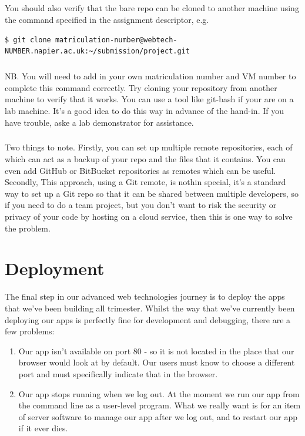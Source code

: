 \documentclass[12pt, a4paper, oneside]{book}
\begin{document}
{\paragraph{} You should also verify that the bare repo can be cloned to another machine using the command specified in the assignment descriptor, e.g.

\begin{lstlisting}[style=DOS]
    $ git clone matriculation-number@webtech-NUMBER.napier.ac.uk:~/submission/project.git
\end{lstlisting}

\paragraph{} NB. You will need to add in your own matriculation number and VM number to complete this command correctly. Try cloning your repository from another machine to verify that it works. You can use a tool like git-bash if your are on a lab machine. It's a good idea to do this way in advance of the hand-in. If you have trouble, aske a lab demonstrator for assistance.

\paragraph{} Two things to note. Firstly, you can set up multiple remote repositories, each of which can act as a backup of your repo and the files that it contains. You can even add GitHub or BitBucket repositories as remotes which can be useful. Secondly, This approach, using a Git remote, is nothin special, it's a standard way to set up a Git repo so that it can be shared between multiple developers, so if you need to do a team project, but you don't want to risk the security or privacy of your code by hosting on a cloud service, then this is one way to solve the problem.


\chapter{Deployment}
\label{deployment}

The final step in our advanced web technologies journey is to deploy the apps that we've been building all trimester. Whilst the way that we've currently been deploying our apps is perfectly fine for development and debugging, there are a few problems:

\begin{enumerate}
\item Our app isn't available on port 80 - so it is not located in the place that our browser would look at by default. Our users must know to choose a different port and must specifically indicate that in the browser.
\item Our app stops running when we log out. At the moment we run our app from the command line as a user-level program. What we really want is for an item of server software to manage our app after we log out, and to restart our app if it ever dies.
\end{enumerate}

}
\end{document}
